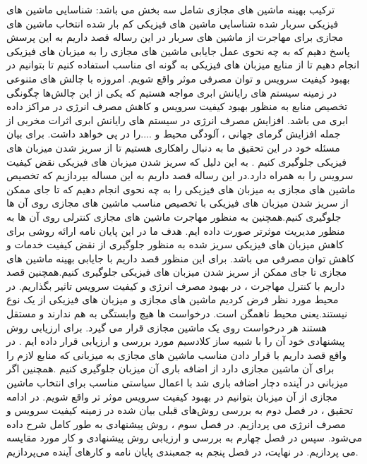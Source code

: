  ترکیب بهینه ماشین های مجازی شامل سه بخش می باشد:
 شناسایی ماشین های فیزیکی سربار شده  
 شناسایی ماشین های فیزیکی کم بار شده
 انتخاب ماشین های مجازی برای مهاجرت از ماشین های سربار
   در این رساله قصد داریم به این پرسش پاسخ دهیم که به چه نحوی عمل جایابی ماشین های مجازی را به میزبان های فیزیکی انجام دهیم تا از منابع میزبان های فیزیکی به گونه ای مناسب استفاده کنیم تا بتوانیم در بهبود کیفیت سرویس و توان مصرفی موثر واقع شویم.
 امروزه با چالش های متنوعی در زمینه سیستم های رایانش ابری مواجه هستیم که یکی از این چالش‌ها چگونگی تخصیص منابع به منظور بهبود کیفیت سرویس و کاهش مصرف انرژی در  مراکز داده ابری می باشد. افزایش مصرف انرژی در سیستم های رایانش ابری اثرات مخربی از جمله  افزایش گرمای جهانی ، آلودگی محیط و ....را در پی خواهد داشت. برای بیان مسئله خود در این تحقیق ما به دنبال راهکاری هستیم تا از سریز شدن میزبان های فیزیکی جلوگیری کنیم . به این دلیل که سریز شدن میزبان های فیزیکی نقض کیفیت سرویس را به همراه دارد.در این رساله قصد داریم به این مساله بپردازیم که تخصیص ماشین های مجازی به میزبان های فیزیکی را به چه نحوی انجام دهیم که تا جای ممکن از سریز شدن میزبان های فیزیکی با تخصیص مناسب ماشین های مجازی روی آن ها جلوگیری کنیم.همچنین به منظور مهاجرت ماشین های مجازی کنترلی روی آن ها به منظور مدیریت موثرتر صورت داده ایم.
  هدف ما در این پایان نامه ارائه روشی برای کاهش میزبان های فیزیکی سریز شده به منظور جلوگیری از نقض کیفیت خدمات و کاهش توان مصرفی می باشد. برای این منظور قصد داریم  با جایابی بهینه ماشین های مجازی تا جای ممکن از سریز شدن میزبان های فیزیکی جلوگیری کنیم.همچنین قصد داریم با کنترل مهاجرت ، در بهبود مصرف انرژی و کیفیت سرویس تاثیر بگذاریم. 
  در محیط مورد نظر فرض کردیم ماشین های مجازی و میزبان های فیزیکی از یک نوع نیستند.یعنی محیط ناهمگن است.
  درخواست ها هیچ وابستگی به هم ندارند و مستقل هستند
  هر درخواست روی یک ماشین مجازی قرار می گیرد.
 برای ارزیابی روش پیشنهادی خود آن را با شبیه ساز کلادسیم مورد بررسی و ارزیابی قرار داده ایم .
   در واقع قصد داریم با قرار دادن مناسب ماشین های مجازی به میزبانی که منابع لازم را برای آن ماشین مجازی دارد از اضافه باری آن میزبان جلوگیری کنیم .همچنین اگر میزبانی در آینده دچار اضافه باری شد با اعمال سیاستی مناسب برای انتخاب ماشین مجازی از آن میزبان بتوانیم در بهبود کیفیت سرویس موثر تر واقع شویم.
   در ادامه تحقیق ، در فصل دوم به بررسی روش‌های قبلی بیان شده در زمینه کیفیت سرویس و مصرف انرژی می پردازیم. در فصل سوم ، روش پیشنهادی به طور کامل شرح داده می‌شود. سپس در فصل چهارم به بررسی و ارزیابی روش پیشنهادی و کار مورد مقایسه می پردازیم. در نهایت، در فصل پنجم به جمع­بندی پایان نامه و کارهای آینده می‌پردازیم.
 